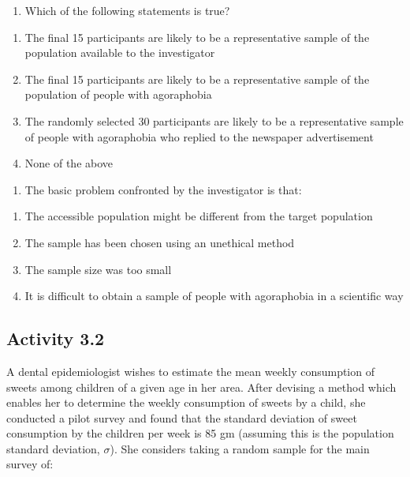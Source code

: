 \documentclass[
]{memoir}
\providecommand{\tightlist}{%
  \setlength{\itemsep}{0pt}\setlength{\parskip}{0pt}}
\begin{document}
\begin{enumerate}
\def\labelenumi{\arabic{enumi}.}
\tightlist
\item
  Which of the following statements is true?
\end{enumerate}

\begin{enumerate}
\def\labelenumi{\alph{enumi})}
\tightlist
\item
  The final 15 participants are likely to be a representative sample of the population available to the investigator
\item
  The final 15 participants are likely to be a representative sample of the population of people with agoraphobia
\item
  The randomly selected 30 participants are likely to be a representative sample of people with agoraphobia who replied to the newspaper advertisement
\item
  None of the above
\end{enumerate}

\begin{enumerate}
\def\labelenumi{\arabic{enumi}.}
\setcounter{enumi}{1}
\tightlist
\item
  The basic problem confronted by the investigator is that:
\end{enumerate}

\begin{enumerate}
\def\labelenumi{\alph{enumi})}
\tightlist
\item
  The accessible population might be different from the target population
\item
  The sample has been chosen using an unethical method
\item
  The sample size was too small
\item
  It is difficult to obtain a sample of people with agoraphobia in a scientific way
\end{enumerate}

\hypertarget{activity-3.2}{%
\subsection*{Activity 3.2}\label{activity-3.2}}

A dental epidemiologist wishes to estimate the mean weekly consumption of sweets among children of a given age in her area. After devising a method which enables her to determine the weekly consumption of sweets by a child, she conducted a pilot survey and found that the standard deviation of sweet consumption by the children per week is 85 gm (assuming this is the population standard deviation, \(\sigma\)). She considers taking a random sample for the main survey of:
\end{document}
